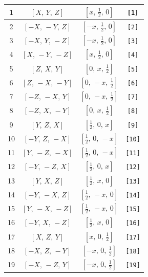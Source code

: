 \documentclass[fleqn,8pt]{jsarticle}
\begin{document}
\begin{longtable}{cccc}
1 & $\left[ X,\, Y,\, Z \right]$ & $\left[ x,\, \frac{1}{2},\, 0 \right]$ & {\tt [1]} \\ \hline
2 & $\left[ - X,\, - Y,\, Z \right]$ & $\left[ - x,\, \frac{1}{2},\, 0 \right]$ & {\tt [2]} \\ \hline
3 & $\left[ - X,\, Y,\, - Z \right]$ & $\left[ - x,\, \frac{1}{2},\, 0 \right]$ & {\tt [3]} \\ \hline
4 & $\left[ X,\, - Y,\, - Z \right]$ & $\left[ x,\, \frac{1}{2},\, 0 \right]$ & {\tt [4]} \\ \hline
5 & $\left[ Z,\, X,\, Y \right]$ & $\left[ 0,\, x,\, \frac{1}{2} \right]$ & {\tt [5]} \\ \hline
6 & $\left[ Z,\, - X,\, - Y \right]$ & $\left[ 0,\, - x,\, \frac{1}{2} \right]$ & {\tt [6]} \\ \hline
7 & $\left[ - Z,\, - X,\, Y \right]$ & $\left[ 0,\, - x,\, \frac{1}{2} \right]$ & {\tt [7]} \\ \hline
8 & $\left[ - Z,\, X,\, - Y \right]$ & $\left[ 0,\, x,\, \frac{1}{2} \right]$ & {\tt [8]} \\ \hline
9 & $\left[ Y,\, Z,\, X \right]$ & $\left[ \frac{1}{2},\, 0,\, x \right]$ & {\tt [9]} \\ \hline
10 & $\left[ - Y,\, Z,\, - X \right]$ & $\left[ \frac{1}{2},\, 0,\, - x \right]$ & {\tt [10]} \\ \hline
11 & $\left[ Y,\, - Z,\, - X \right]$ & $\left[ \frac{1}{2},\, 0,\, - x \right]$ & {\tt [11]} \\ \hline
12 & $\left[ - Y,\, - Z,\, X \right]$ & $\left[ \frac{1}{2},\, 0,\, x \right]$ & {\tt [12]} \\ \hline
13 & $\left[ Y,\, X,\, Z \right]$ & $\left[ \frac{1}{2},\, x,\, 0 \right]$ & {\tt [13]} \\ \hline
14 & $\left[ - Y,\, - X,\, Z \right]$ & $\left[ \frac{1}{2},\, - x,\, 0 \right]$ & {\tt [14]} \\ \hline
15 & $\left[ Y,\, - X,\, - Z \right]$ & $\left[ \frac{1}{2},\, - x,\, 0 \right]$ & {\tt [15]} \\ \hline
16 & $\left[ - Y,\, X,\, - Z \right]$ & $\left[ \frac{1}{2},\, x,\, 0 \right]$ & {\tt [16]} \\ \hline
17 & $\left[ X,\, Z,\, Y \right]$ & $\left[ x,\, 0,\, \frac{1}{2} \right]$ & {\tt [17]} \\ \hline
18 & $\left[ - X,\, Z,\, - Y \right]$ & $\left[ - x,\, 0,\, \frac{1}{2} \right]$ & {\tt [18]} \\ \hline
19 & $\left[ - X,\, - Z,\, Y \right]$ & $\left[ - x,\, 0,\, \frac{1}{2} \right]$ & {\tt [19]} \\ \hline

\end{longtable}
\end{document}
